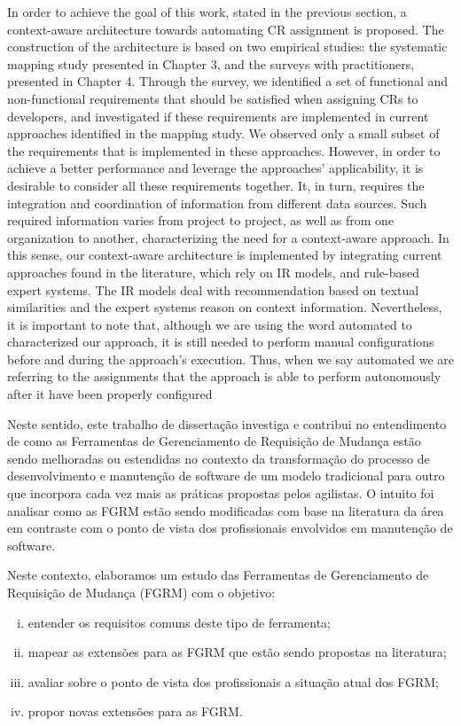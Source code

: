 In order to achieve the goal of this work, stated in the previous section, a context-aware
architecture towards automating CR assignment is proposed. The construction of the architecture is based on two empirical studies: the systematic mapping study presented in Chapter 3, and the surveys with practitioners, presented in Chapter 4. Through the survey, we identified a set of functional and non-functional requirements
that should be satisfied when assigning CRs to developers, and investigated if these requirements are implemented in current approaches identified in the mapping study. We observed only a small subset of the requirements that is implemented in these approaches. However, in order to achieve a better performance and leverage the approaches’ applicability, it is desirable to consider all these requirements together. It, in turn, requires the integration and coordination of information from different data sources. Such required information varies from project to project, as well as from one organization
to another, characterizing the need for a context-aware approach. In this sense, our context-aware architecture is implemented by integrating current approaches found in the literature, which rely on IR models, and rule-based expert systems. The IR models deal with recommendation based on textual similarities and the expert systems reason on context information. Nevertheless, it is important to note that, although we are using the word automated to
characterized our approach, it is still needed to perform manual configurations before and during the approach’s execution. Thus, when we say automated we are referring to the assignments that the approach is able to perform autonomously after it have been properly configured

Neste sentido, este trabalho de dissertação investiga e contribui no entendimento de
como as Ferramentas de Gerenciamento de Requisição de Mudança estão sendo melhoradas ou estendidas
no contexto da transformação do processo de desenvolvimento e manutenção de software de um modelo
tradicional para outro que incorpora cada vez mais as práticas propostas pelos agilistas. O intuito
foi analisar como as FGRM estão sendo modificadas com base na literatura da área em contraste com o
ponto de vista dos profissionais envolvidos em manutenção de software.

Neste contexto, elaboramos um estudo das Ferramentas de Gerenciamento de Requisição de Mudança (FGRM) com o objetivo:
\begin{enumerate}[(i)]
	\item entender os requisitos comuns deste tipo de ferramenta;
	\item mapear as extensões para as FGRM que estão sendo propostas na literatura;
	\item avaliar sobre o ponto de vista dos profissionais a situação atual dos FGRM\@;
	\item propor novas extensões para as FGRM\@.  
\end{enumerate}

